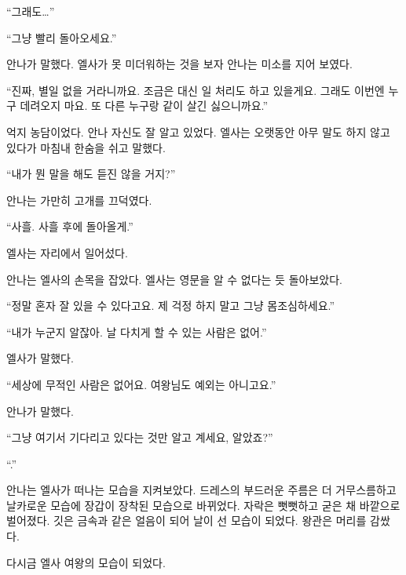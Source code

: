 ``그래도\ldots''

``그냥 빨리 돌아오세요.''

안나가 말했다. 엘사가 못 미더워하는 것을 보자 안나는 미소를 지어 보였다.

``진짜, 별일 없을 거라니까요. 조금은 대신 일 처리도 하고 있을게요. 그래도 이번엔 누구 데려오지 마요. 또 다른 누구랑 같이 살긴 싫으니까요.''

억지 농담이었다. 안나 자신도 잘 알고 있었다. 엘사는 오랫동안 아무 말도 하지 않고 있다가 마침내 한숨을 쉬고 말했다.

``내가 뭔 말을 해도 듣진 않을 거지?''

안나는 가만히 고개를 끄덕였다.

``사흘. 사흘 후에 돌아올게.''

엘사는 자리에서 일어섰다.

안나는 엘사의 손목을 잡았다. 엘사는 영문을 알 수 없다는 듯 돌아보았다.

``정말 혼자 잘 있을 수 있다고요. 제 걱정 하지 말고 그냥 몸조심하세요.''

``내가 누군지 알잖아. 날 다치게 할 수 있는 사람은 없어.''

엘사가 말했다.

``세상에 무적인 사람은 없어요. 여왕님도 예외는 아니고요.''

안나가 말했다.

``그냥 여기서 기다리고 있다는 것만 알고 계세요, 알았죠?''

``.''

안나는 엘사가 떠나는 모습을 지켜보았다. 드레스의 부드러운 주름은 더 거무스름하고 날카로운 모습에 장갑이 장착된 모습으로 바뀌었다. 자락은 뻣뻣하고 굳은 채 바깥으로 벌어졌다. 깃은 금속과 같은 얼음이 되어 날이 선 모습이 되었다. 왕관은 머리를 감쌌다.

다시금 엘사 여왕의 모습이 되었다.

